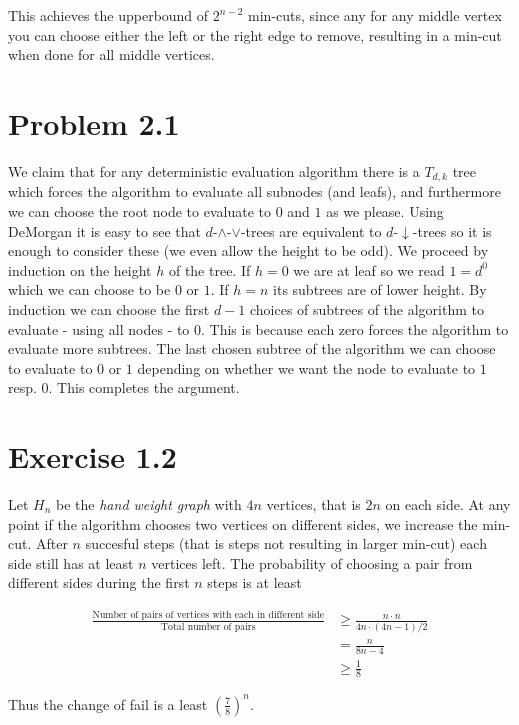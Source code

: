 This achieves the upperbound of $2^{n-2}$ min-cuts, since any for any middle vertex you can choose either the left or the right edge to remove, resulting in a min-cut when done for all middle vertices.

\section*{Problem 2.1}

We claim that for any deterministic evaluation algorithm there is a $T_{d,k}$ tree which forces the algorithm to evaluate all subnodes (and leafs), and furthermore we can choose the root node to evaluate to $0$ and $1$ as we please.
Using DeMorgan it is easy to see that $d$-$\land$-$\lor$-trees are equivalent to $d$-$\downarrow$-trees so it is enough to consider these (we even allow the height to be odd).
We proceed by induction on the height $h$ of the tree. 
If $h = 0$ we are at leaf so we read $1 = d^0$ which we can choose to be $0$ or $1$.
If $h = n$ its subtrees are of lower height. 
By induction we can choose the first $d-1$ choices of subtrees of the algorithm to evaluate - using all nodes - to 0.
This is because each zero forces the algorithm to evaluate more subtrees.
The last chosen subtree of the algorithm we can choose to evaluate to $0$ or $1$ depending on whether we want the node to evaluate to $1$ resp. $0$.
This completes the argument.

\section*{Exercise 1.2}

Let $H_n$ be the \emph{hand weight graph} with $4n$ vertices, that is $2n$ on each side.
At any point if the algorithm chooses two vertices on different sides, we increase the min-cut.  After $n$ succesful steps (that is steps not resulting in larger min-cut) each side still has at least $n$ vertices left. The probability of choosing a pair from different sides during the first $n$ steps is at least

\begin{align*}
	\frac{\text{Number of pairs of vertices with each in different side}}
	{\text{Total number of pairs}}
	&\geq \frac{ n \cdot n }
	{4n \cdot (4n - 1) / 2}
	\\ &= \frac{n}{8n - 4}
	\\ &\geq \frac{1}{8}
\end{align*}

Thus the change of fail is a least $\left(\frac{7}{8}\right)^n$.
